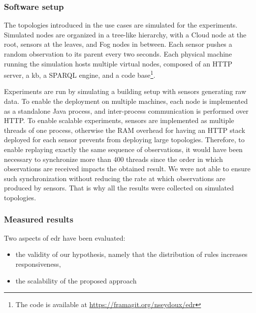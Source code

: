 \documentclass{iosart2c}
\begin{document}
\subsubsection{Software setup}

The topologies introduced in the use cases are simulated for the experiments.
Simulated nodes are organized in a tree-like hierarchy, with a Cloud node at the root, sensors at the leaves, and Fog nodes in between.
Each sensor pushes a random observation to its parent every two seconds.
Each physical machine running the simulation hosts multiple virtual nodes, composed of an HTTP server, a \gls{kb}, a SPARQL engine, and a code base\footnote{The code is available at \url{https://framagit.org/nseydoux/edr}}.

Experiments are run by simulating a building setup with sensors generating raw data. 
To enable the deployment on multiple machines, each node is implemented as a standalone Java process, and inter-process communication is performed over HTTP. 
To enable scalable experiments, sensors are implemented as multiple threads of one process, otherwise the RAM overhead for having an HTTP stack deployed for each sensor prevents from deploying large topologies.
Therefore, to enable replaying exactly the same sequence of observations, it would have been necessary to synchronize more than 400 threads since the order in which observations are received impacts the obtained result. 
We were not able to ensure such synchronization without reducing the rate at which observations are produced by sensors.
That is why all the results were collected on simulated topologies.

\subsubsection{Measured results}

Two aspects of \gls{edr} have been evaluated:
\begin{itemize}
	\item the validity of our hypothesis, namely that the distribution of rules increases responsiveness,
	\item the scalability of the proposed approach
\end{itemize} 
\end{document}
